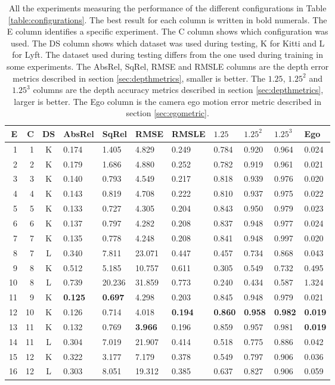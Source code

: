 \begin{table}[H]
\centering
{\setlength{\tabcolsep}{0.4em}
\begin{tabular}{|r|r|c||l|l|l|l||l|l|l||l|}
\hline
E & C & DS & AbsRel & SqRel & RMSE & RMSLE & $1.25$ & $1.25^2$ & $1.25^3$ & Ego \\
\hline
1 & 1 & K & 0.174 & 1.405 & 4.829 & 0.249 & 0.784 & 0.920 & 0.964 & 0.024 \\
\hline
2 & 2 & K & 0.179 & 1.686 & 4.880 & 0.252 & 0.782 & 0.919 & 0.961 & 0.021 \\
\hline
3 & 3 & K & 0.140 & 0.793 & 4.549 & 0.217 & 0.818 & 0.939 & 0.976 & 0.020 \\
\hline
4 & 4 & K & 0.143 & 0.819 & 4.708 & 0.222 & 0.810 & 0.937 & 0.975 & 0.022 \\
\hline
5 & 5 & K & 0.133 & 0.727 & 4.305 & 0.204 & 0.843 & 0.950 & 0.979 & 0.023 \\
\hline
6 & 6 & K & 0.137 & 0.797 & 4.282 & 0.208 & 0.837 & 0.948 & 0.977 & 0.024 \\
\hline
\hline
7 & 7 & K & 0.135 & 0.778 & 4.248 & 0.208 & 0.841 & 0.948 & 0.997 & 0.020 \\
\hline
8 & 7 & L & 0.340 & 7.811 & 23.071 & 0.447 & 0.457 & 0.734 & 0.868 & 0.043 \\
\hline
9 & 8 & K & 0.512 & 5.185 & 10.757 & 0.611 & 0.305 & 0.549 & 0.732 & 0.495 \\
\hline
10 & 8 & L & 0.739 & 20.236 & 31.859 & 0.773 & 0.240 & 0.434 & 0.587 & 1.324 \\
\hline
\hline
11 & 9 & K & \textbf{0.125} & \textbf{0.697} & 4.298 & 0.203 & 0.845 & 0.948 & 0.979 & 0.021 \\
\hline
12 & 10 & K & 0.126 & 0.714 & 4.018 & \textbf{0.194} & \textbf{0.860} & \textbf{0.958} & \textbf{0.982} & \textbf{0.019} \\
\hline
\hline
13 & 11 & K & 0.132 & 0.769 & \textbf{3.966} & 0.196 & 0.859 & 0.957 & 0.981 & \textbf{0.019} \\
\hline
14 & 11 & L & 0.304 & 7.019 & 21.907 & 0.414 & 0.518 & 0.775 & 0.886 & 0.042 \\
\hline
\hline
15 & 12 & K & 0.322 & 3.177 & 7.179 & 0.378 & 0.549 & 0.797 & 0.906 & 0.036 \\
\hline
16 & 12 & L & 0.303 & 8.051 & 19.312 & 0.385 & 0.637 & 0.827 & 0.906 & 0.059 \\
\hline
\end{tabular}}
\caption{All the experiments measuring the performance of the different configurations in Table \ref{table:configurations}. The best result for each column is written in bold numerals. The E column identifies a specific experiment. The C column shows which configuration was used. The DS column shows which dataset was used during testing, K for Kitti and L for Lyft. The dataset used during testing differs from the one used during training in some experiments. The AbsRel, SqRel, RMSE and RMSLE columns are the depth error metrics described in section \ref{sec:depthmetrics}, smaller is better. The $1.25$, $1.25^2$ and $1.25^3$ columns are the depth accuracy metrics described in section \ref{sec:depthmetrics}, larger is better. The Ego column is the camera ego motion error metric described in section \ref{sec:egometric}.}

\end{table}
